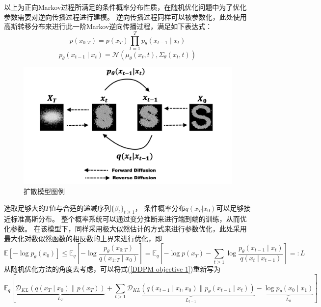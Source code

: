 以上为正向Markov过程所满足的条件概率分布性质，在随机优化问题中为了优化参数需要对逆向传播过程进行建模。
逆向传播过程同样可以被参数化，此处使用高斯转移分布来进行此一阶Markov逆向传播过程，满足如下表达式：
\begin{equation}
    p\left(x_{0: T}\right)=p\left(x_T\right) \prod_{t=1}^T p_\theta\left(x_{t-1} \mid x_t\right)
    \end{equation}
    \begin{equation}
        p_\theta\left(x_{t-1} \mid x_t\right)=\mathcal{N}\left(\mu_\theta\left(x_t, t\right), \Sigma_\theta\left(x_t, t\right)\right)
        \end{equation}
        \begin{figure}[H]
            \centering
            \includegraphics[scale = 0.2]{Picture/Diffusion.png}
            \caption{扩散模型图例}
            \label{Diffusion}
        \end{figure}
选取足够大的$T$值与合适的递减序列$\{\beta_t\}_{t\geq 1}$， 条件概率分布$q(x_{T}|x_0)$可以足够接近标准高斯分布。
整个概率系统可以通过变分推断来进行端到端的训练，从而优化参数。
在该模型下，同样采用极大似然估计的方式来进行参数优化，此处采用最大化对数似然函数的相反数的上界来进行优化，即
\begin{equation}
    \mathbb{E}\left[-\log p_\theta\left({x}_0\right)\right] \leq \mathbb{E}_q\left[-\log \frac{p_\theta\left({x}_{0: T}\right)}{q\left({x}_{1: T} \mid {x}_0\right)}\right]=\mathbb{E}_q\left[-\log p\left({x}_T\right)-\sum_{t \geq 1} \log \frac{p_\theta\left({x}_{t-1} \mid {x}_t\right)}{q\left({x}_t \mid {x}_{t-1}\right)}\right]=: L
    \label{DDPM objective 1}
\end{equation}
从随机优化方法的角度去考虑，可以将式(\ref{DDPM objective 1})重新写为
\begin{equation}
\mathbb{E}_q[\underbrace{\mathcal{D}_{K L}\left(q\left(x_T \mid x_0\right) \| p\left(x_T\right)\right)}_{L_T}+\sum_{t>1} \underbrace{\mathcal{D}_{K L}\left(q\left(x_{t-1} \mid x_t, x_0\right) \| p_\theta\left(x_{t-1} \mid x_t\right)\right)}_{L_{t-1}}-\underbrace{\log p_\theta\left(x_0 \mid x_1\right)}_{L_0}]
    \end{equation}
